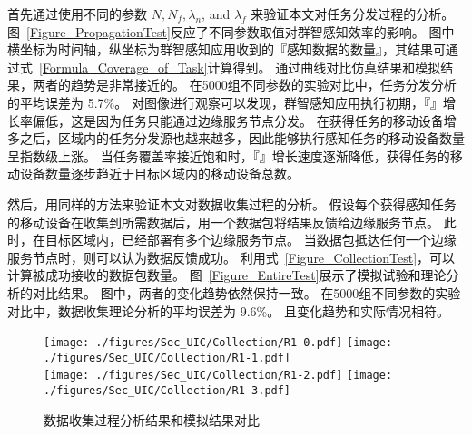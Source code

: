 首先通过使用不同的参数 $N, N_f, \lambda_n$, and $\lambda_f$ 来验证本文对任务分发过程的分析。
图~\ref{Figure_PropagationTest}反应了不同参数取值对群智感知效率的影响。
图中横坐标为时间轴，纵坐标为群智感知应用收到的『感知数据的数量』，其结果可通过式~\eqref{Formula_Coverage_of_Task}计算得到。
通过曲线对比仿真结果和模拟结果，两者的趋势是非常接近的。
在5000组不同参数的实验对比中，任务分发分析的平均误差为 5.7\%。
对图像进行观察可以发现，群智感知应用执行初期，『』增长率偏低，这是因为任务只能通过边缘服务节点分发。
在获得任务的移动设备增多之后，区域内的任务分发源也越来越多，因此能够执行感知任务的移动设备数量呈指数级上涨。
当任务覆盖率接近饱和时，『』增长速度逐渐降低，获得任务的移动设备数量逐步趋近于目标区域内的移动设备总数。


然后，用同样的方法来验证本文对数据收集过程的分析。
假设每个获得感知任务的移动设备在收集到所需数据后，用一个数据包将结果反馈给边缘服务节点。
此时，在目标区域内，已经部署有多个边缘服务节点。
当数据包抵达任何一个边缘服务节点时，则可以认为数据反馈成功。
利用式~\eqref{Figure_CollectionTest}，可以计算被成功接收的数据包数量。
图~\ref{Figure_EntireTest}展示了模拟试验和理论分析的对比结果。
图中，两者的变化趋势依然保持一致。
在5000组不同参数的实验对比中，数据收集理论分析的平均误差为 9.6\%。
且变化趋势和实际情况相符。

\begin{figure}[!h]
  \centering
  {\texttt{[image: ./figures/Sec\_UIC/Collection/R1-0.pdf]}}
  {\texttt{[image: ./figures/Sec\_UIC/Collection/R1-1.pdf]}}\\
  {\texttt{[image: ./figures/Sec\_UIC/Collection/R1-2.pdf]}}
  {\texttt{[image: ./figures/Sec\_UIC/Collection/R1-3.pdf]}}
  \vspace{-1em}
  \caption{数据收集过程分析结果和模拟结果对比}
  \label{Figure_CollectionTest}
  \end{figure}

